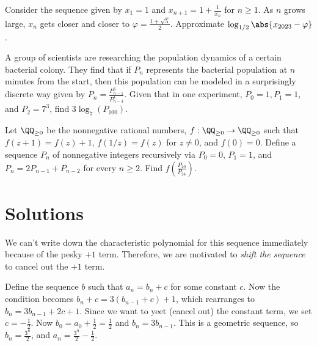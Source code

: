\documentclass[11pt]{scrartcl}
\begin{document}
\begin{problem}
    \label{pro:cmimc-estimation}
    Consider the sequence given by $x_1 = 1$ and $x_{n + 1} = 1 + \frac{1}{x_n}$ for $n \ge 1$. As $n$ grows large, $x_n$ gets closer and closer to $\varphi = \frac{1 + \sqrt{5}}{2}$. Approximate $\log_{1/2}\abs{x_{2023} - \varphi}$.
\end{problem}

\begin{problem}[SMT 2024/T10]
    \label{pro:smt-team}
	A group of scientists are researching the population dynamics of a certain bacterial colony. They find that if $P_n$ represents the bacterial population at $n$ minutes from the start, then this population can be modeled in a surprisingly discrete way given by $P_n = \frac{P_{n-1}^3}{P_{n-3}^{4}}$. Given that in one experiment, $P_0=1, P_1=1$, and $P_2 = 7^3$, find $3\log_7(P_{100})$.
\end{problem}

\begin{problem}[CMIMC 2024/A9]
    \label{pro:cmimc-ant}
    Let $\QQ_{\ge 0}$ be the nonnegative rational numbers, $f : \QQ_{\ge 0} \to \QQ_{\ge 0}$ such that $f(z + 1) = f(z) + 1$, $f(1/z) = f(z)$ for $z \neq 0$, and $f(0) = 0$. Define a sequence $P_n$ of nonnegative integers recursively via $P_0 = 0$, $P_1 = 1$, and $P_n = 2P_{n - 1} + P_{n - 2}$ for every $n \ge 2$. Find $f\left(\frac{P_{20}}{P_{24}}\right)$.
\end{problem}

\pagebreak

\section{Solutions}

\begin{solution}{}
    We can't write down the characteristic polynomial for this sequence immediately because of the pesky $+1$ term. Therefore, we are motivated to \emph{shift the sequence} to cancel out the $+ 1$ term.
    
    Define the sequence $b$ such that $a_n = b_n + c$ for some constant $c$. Now the condition becomes $b_n + c = 3(b_{n - 1} + c) + 1$, which rearranges to $b_n = 3b_{n - 1} + 2c + 1$. Since we want to yeet (cancel out) the constant term, we set $c = -\frac12$. Now $b_0 = a_0 + \frac12 = \frac12$ and $b_n = 3b_{n - 1}$. This is a geometric sequence, so $b_n = \frac{3^n}{2}$, and $a_n = \frac{3^n}{2} - \frac{1}{2}$.
\end{solution}
\end{document}
